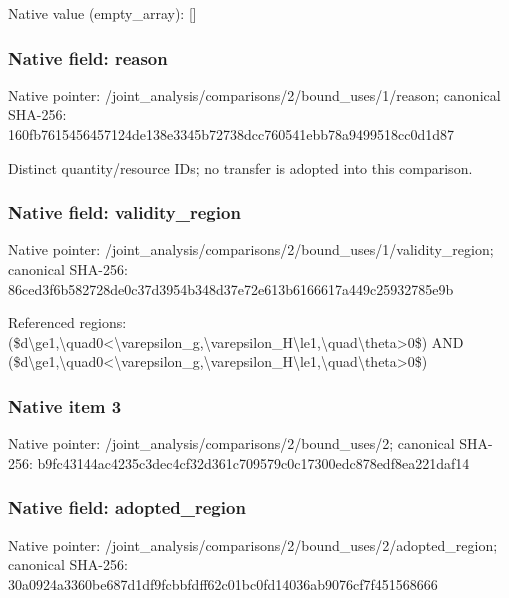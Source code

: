 \documentclass[10pt,a4paper]{article}
\begin{document}
Native value (empty\_\allowbreak{}array): []

\subsubsection{Native field: reason}
Native pointer: /joint\_\allowbreak{}analysis/comparisons/2/bound\_\allowbreak{}uses/1/reason; canonical SHA-256: 160fb7615456457124de138e3345b72738dcc760541ebb78a9499518cc0d1d87

\begingroup\raggedright\sloppy Distinct quantity/\allowbreak{}resource IDs;\allowbreak{} no transfer is adopted into this comparison.\par\endgroup

\subsubsection{Native field: validity\_\allowbreak{}region}
Native pointer: /joint\_\allowbreak{}analysis/comparisons/2/bound\_\allowbreak{}uses/1/validity\_\allowbreak{}region; canonical SHA-256: 86ced3f6b582728de0c37d3954b348d37e72e613b6166617a449c25932785e9b

\begingroup\raggedright\sloppy Referenced regions:\allowbreak{} (\$d\textbackslash{}ge1,\allowbreak{}\textbackslash{}quad0<\textbackslash{}varepsilon\_\allowbreak{}g,\allowbreak{}\textbackslash{}varepsilon\_\allowbreak{}H\textbackslash{}le1,\allowbreak{}\textbackslash{}quad\textbackslash{}theta>0\$) AND (\$d\textbackslash{}ge1,\allowbreak{}\textbackslash{}quad0<\textbackslash{}varepsilon\_\allowbreak{}g,\allowbreak{}\textbackslash{}varepsilon\_\allowbreak{}H\textbackslash{}le1,\allowbreak{}\textbackslash{}quad\textbackslash{}theta>0\$)\par\endgroup

\subsubsection{Native item 3}
Native pointer: /joint\_\allowbreak{}analysis/comparisons/2/bound\_\allowbreak{}uses/2; canonical SHA-256: b9fc43144ac4235c3dec4cf32d361c709579c0c17300edc878edf8ea221daf14

\subsubsection{Native field: adopted\_\allowbreak{}region}
Native pointer: /joint\_\allowbreak{}analysis/comparisons/2/bound\_\allowbreak{}uses/2/adopted\_\allowbreak{}region; canonical SHA-256: 30a0924a3360be687d1df9fcbbfdff62c01bc0fd14036ab9076cf7f451568666
\end{document}

